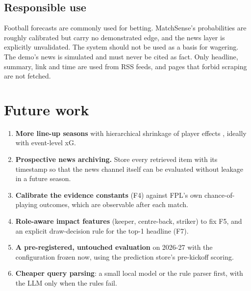 \documentclass[11pt,a4paper]{article}
\begin{document}
\subsection{Responsible use}
Football forecasts are commonly used for betting. MatchSense's probabilities
are roughly calibrated but carry no demonstrated edge, and the news layer is
explicitly unvalidated. The system should not be used as a basis for wagering.
The demo's news is simulated and must never be cited as fact. Only headline,
summary, link and time are used from RSS feeds, and pages that forbid scraping
are not fetched.

\section{Future work}\label{sec:future}
\begin{enumerate}
  \item \textbf{More line-up seasons} with hierarchical shrinkage of player
        effects \citep{baio2010,kharrat2020}, ideally with event-level xG.
  \item \textbf{Prospective news archiving.} Store every retrieved item with
        its timestamp so that the news channel itself can be evaluated
        without leakage in a future season.
  \item \textbf{Calibrate the evidence constants} (F4) against FPL's own
        chance-of-playing outcomes, which are observable after each match.
  \item \textbf{Role-aware impact features} (keeper, centre-back, striker) to
        fix F5, and an explicit draw-decision rule for the top-1 headline (F7).
  \item \textbf{A pre-registered, untouched evaluation} on 2026-27 with the
        configuration frozen now, using the prediction store's pre-kickoff
        scoring.
  \item \textbf{Cheaper query parsing}: a small local model or the rule parser
        first, with the LLM only when the rules fail.
\end{enumerate}

\end{document}
